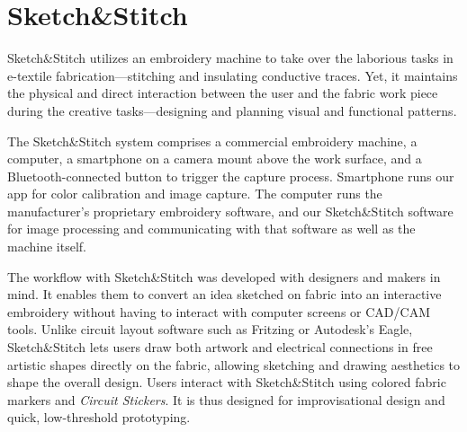 \documentclass{sigchi}
\begin{document}
\section{Sketch\&Stitch}
Sketch\&Stitch utilizes an embroidery machine to take over the laborious tasks in e-textile fabrication---stitching and insulating conductive traces. Yet, it maintains the physical and direct interaction between the user and the fabric work piece during the creative tasks---designing and planning visual and functional patterns. 

The Sketch\&Stitch system comprises a commercial embroidery machine, a computer, a smartphone on a camera mount above the work surface, and a Bluetooth-connected button to trigger the capture process. Smartphone runs our app for color calibration and image capture. The computer runs the manufacturer's proprietary embroidery software, and our Sketch\&Stitch software for image processing and communicating with that software as well as the machine itself.

The workflow with Sketch\&Stitch was developed with designers and makers in mind. %
It enables them to convert an idea sketched on fabric into an interactive embroidery without having to interact with computer screens or CAD/CAM tools. Unlike circuit layout software such as Fritzing or Autodesk's Eagle, Sketch\&Stitch lets users draw both artwork and electrical connections in free artistic shapes directly on the fabric, allowing sketching and drawing aesthetics to shape the overall design. 
Users interact with Sketch\&Stitch using colored fabric markers and \textit{Circuit Stickers}. It is thus designed for improvisational design and quick, low-threshold prototyping.
 

\end{document}
